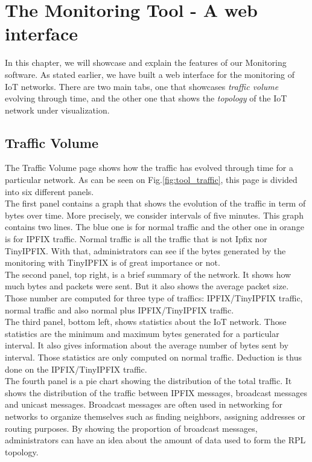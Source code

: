 \chapter{The Monitoring Tool - A web interface}

In this chapter, we will showcase and explain the features of our Monitoring software. As stated earlier, we have built a web interface for the monitoring of IoT networks. There are two main tabs, one that showcases \textit{traffic volume} evolving through time, and the other one that shows the \textit{topology} of the IoT network under visualization.

\section{Traffic Volume}

The Traffic Volume page shows how the traffic has evolved through time for a particular network. As can be seen on Fig.\ref{fig:tool_traffic}, this page is divided into six different panels. \\

The first panel contains a graph that shows the evolution of the traffic in term of bytes over time. More precisely, we consider intervals of five minutes. This graph contains two lines. The blue one is for normal traffic and the other one in orange is for IPFIX traffic. Normal traffic is all the traffic that is not Ipfix nor TinyIPFIX. With that, administrators can see if the bytes generated by the monitoring with TinyIPFIX is of great importance or not. \\

The second panel, top right, is a brief summary of the network. It shows how much bytes and packets were sent. But it also shows the average packet size. Those number are computed for three type of traffics: IPFIX/TinyIPFIX traffic, normal traffic and also normal plus IPFIX/TinyIPFIX traffic.\\

The third panel, bottom left, shows statistics about the IoT network. Those statistics are the minimum and maximum bytes generated for a particular interval. It also gives information about the average number of bytes sent by interval. Those statistics are only computed on normal traffic. Deduction is thus done on the IPFIX/TinyIPFIX traffic.\\

The fourth panel is a pie chart showing the distribution of the total traffic. It shows the distribution of the traffic between IPFIX messages, broadcast messages and unicast messages. Broadcast messages are often used in networking for networks to organize  themselves such as finding neighbors, assigning addresses or routing purposes. By showing the proportion of broadcast messages, administrators can have an idea about the amount of data used to form the RPL topology.\\

